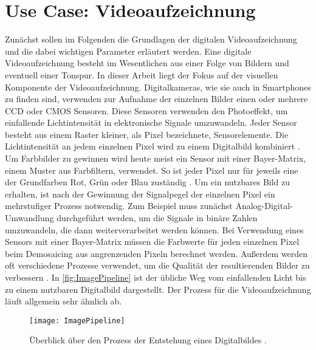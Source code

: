 \section{Use Case: Videoaufzeichnung}
\label{sec:Videoaufzeichnung}

Zunächst sollen im Folgenden die Grundlagen der digitalen Videoaufzeichnung und die dabei wichtigen Parameter erläutert werden.
Eine digitale Videoaufzeichnung besteht im Wesentlichen aus einer Folge von Bildern und eventuell einer Tonspur.
In dieser Arbeit liegt der Fokus auf der visuellen Komponente der Videoaufzeichnung.
Digitalkameras, wie sie auch in Smartphones zu finden sind, verwenden zur Aufnahme der einzelnen Bilder einen oder mehrere \ac{CCD} oder \ac{CMOS} Sensoren.
Diese Sensoren verwenden den Photoeffekt, um einfallende Lichtintensität in elektronische Signale umzuwandeln.
Jeder Sensor besteht aus einem Raster kleiner, als Pixel bezeichnete, Sensorelemente.
Die Lichtintensität an jedem einzelnen Pixel wird zu einem Digitalbild kombiniert \cite[S. 63ff.]{Szeliski_ComputerVision}.
Um Farbbilder zu gewinnen wird heute meist ein Sensor mit einer Bayer-Matrix, einem Muster aus Farbfiltern, verwendet.
So ist jeder Pixel nur für jeweils eine der Grundfarben Rot, Grün oder Blau zuständig \cite[S. 420ff.]{Schmidt_Videotechnik}.
Um ein nutzbares Bild zu erhalten, ist nach der Gewinnung der Signalpegel der einzelnen Pixel ein mehrstufiger Prozess notwendig.
Zum Beispiel muss zunächst Analog-Digital-Umwandlung durchgeführt werden, um die Signale in binäre Zahlen umzuwandeln, die dann weiterverarbeitet werden können.
Bei Verwendung eines Sensors mit einer Bayer-Matrix müssen die Farbwerte für jeden einzelnen Pixel beim Demosaicing aus angrenzenden Pixeln berechnet werden.
Außerdem werden oft verschiedene Prozesse verwendet, um die Qualität der resultierenden Bilder zu verbessern \cite[S. 63ff.]{Szeliski_ComputerVision}.
In \autoref{fig:ImagePipeline} ist der übliche Weg vom einfallenden Licht bis zu einem nutzbaren Digitalbild dargestellt. 
Der Prozess für die Videoaufzeichnung läuft allgemein sehr ähnlich ab.
\begin{figure}
    \centering
    \texttt{[image: ImagePipeline]}
    \caption{Überblick über den Prozess der Entstehung eines Digitalbildes \cite[S. 64ff.]{Szeliski_ComputerVision}.}
    \label{fig:ImagePipeline}
\end{figure}


